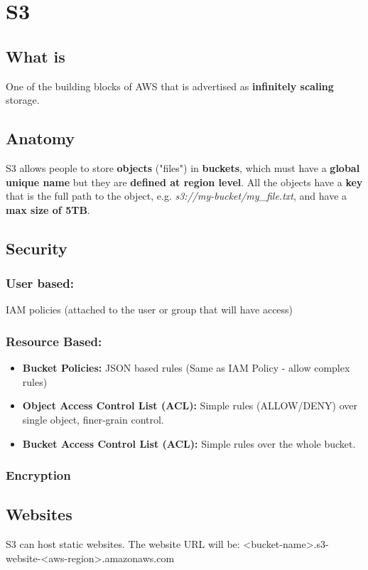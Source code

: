 \section{S3}

\subsection{What is}
One of the building blocks of AWS that is advertised as \textbf{infinitely scaling} storage.

\subsection{Anatomy}
S3 allows people to store \textbf{objects} ("files") in \textbf{buckets}, which must have a \textbf{global unique name} but they are \textbf{defined at region level}.
All the objects have a \textbf{key} that is the full path to the object, e.g. \textit{s3://my-bucket/my\_file.txt}, and have a \textbf{max size of 5TB}.

\subsection{Security}
\subsubsection{User based:} IAM policies (attached to the user or group that will have access)
\subsubsection{Resource Based:}
\begin{itemize}
	\item \textbf{Bucket Policies:} JSON based rules (Same as IAM Policy - allow complex rules)
	\item \textbf{Object Access Control List (ACL):} Simple rules (ALLOW/DENY) over single object, finer-grain control.
	\item \textbf{Bucket Access Control List (ACL):} Simple rules over the whole bucket.
\end{itemize}
\subsubsection{Encryption}

\subsection{Websites}
S3 can host static websites.
The website URL will be: <bucket-name>.s3-website-<aws-region>.amazonaws.com

